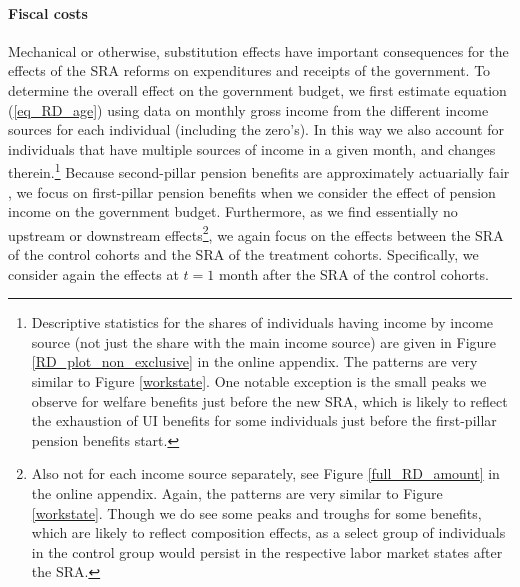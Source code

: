 \documentclass[12pt,a4paper]{article}
\begin{document}
\paragraph{Fiscal costs}  

Mechanical or otherwise, substitution effects have important consequences for the effects of the SRA reforms on expenditures and receipts of the government. To determine the overall effect on the government budget, we first estimate equation (\ref{eq_RD_age}) using data on monthly gross income from the different income sources for each individual (including the zero's). In this way we also account for individuals that have multiple sources of income in a given month, and changes therein.\footnote{Descriptive statistics for the shares of individuals having income by income source (not just the share with the main income source) are given in Figure \ref{RD_plot_non_exclusive} in the online appendix. The patterns are very similar to Figure \ref{workstate}. One notable exception is the small peaks we observe for welfare benefits just before the new SRA, which is likely to reflect the exhaustion of UI benefits for some individuals just before the first-pillar pension benefits start.} Because second-pillar pension benefits are approximately actuarially fair \citep{de_vos_social_2019}, we focus on first-pillar pension benefits when we consider the effect of pension income on the government budget. %
Furthermore, as we find essentially no upstream or downstream effects\footnote{Also not for each income source separately, see Figure \ref{full_RD_amount} in the online appendix. Again, the patterns are very similar to Figure \ref{workstate}. Though we do see some peaks and troughs for some benefits, which are likely to reflect composition effects, as a select group of individuals in the control group would persist in the respective labor market states after the SRA.}, we again focus on the effects between the SRA of the control cohorts and the SRA of the treatment cohorts. Specifically, we consider again the effects at $t=1$ month after the SRA of the control cohorts.
\end{document}
